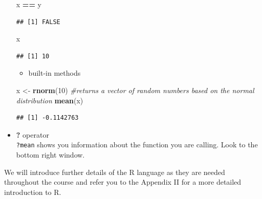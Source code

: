 \documentclass[
]{article}
\newenvironment{Shaded}{\begin{snugshade}}{\end{snugshade}}
\newcommand{\CommentTok}[1]{\textcolor[rgb]{0.56,0.35,0.01}{\textit{#1}}}
\newcommand{\DecValTok}[1]{\textcolor[rgb]{0.00,0.00,0.81}{#1}}
\newcommand{\KeywordTok}[1]{\textcolor[rgb]{0.13,0.29,0.53}{\textbf{#1}}}
\newcommand{\NormalTok}[1]{#1}
\newcommand{\OperatorTok}[1]{\textcolor[rgb]{0.81,0.36,0.00}{\textbf{#1}}}
\newcommand{\StringTok}[1]{\textcolor[rgb]{0.31,0.60,0.02}{#1}}
\providecommand{\tightlist}{%
  \setlength{\itemsep}{0pt}\setlength{\parskip}{0pt}}
\begin{document}
\begin{itemize}
\begin{Shaded}
\begin{Highlighting}[]
\NormalTok{x }\OperatorTok{==}\StringTok{ }\NormalTok{y}
\end{Highlighting}
\end{Shaded}

\begin{verbatim}
## [1] FALSE
\end{verbatim}

\begin{Shaded}
\begin{Highlighting}[]
\NormalTok{x}
\end{Highlighting}
\end{Shaded}

\begin{verbatim}
## [1] 10
\end{verbatim}

  \begin{itemize}
  \tightlist
  \item
    built-in methods
  \end{itemize}

\begin{Shaded}
\begin{Highlighting}[]
\NormalTok{x <-}\StringTok{ }\KeywordTok{rnorm}\NormalTok{(}\DecValTok{10}\NormalTok{) }\CommentTok{#returns a vector of random numbers based on the normal distribution}
\KeywordTok{mean}\NormalTok{(x)}
\end{Highlighting}
\end{Shaded}

\begin{verbatim}
## [1] -0.1142763
\end{verbatim}
\item
  \textbf{?} operator\\
  \texttt{?mean} shows you information about the function you are
  calling. Look to the bottom right window.
\end{itemize}

We will introduce further details of the R language as they are needed
throughout the course and refer you to the Appendix II for a more
detailed introduction to R.

\pagebreak
\end{document}
